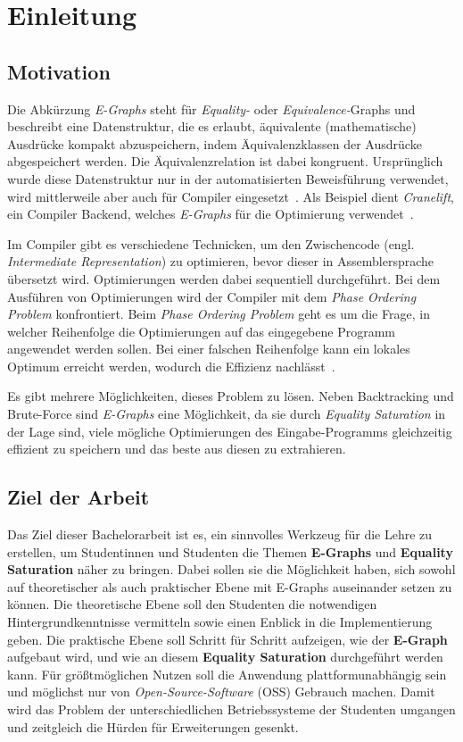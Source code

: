 \section{Einleitung}

\subsection{Motivation}

\noindent Die Abkürzung \textit{E-Graphs} steht für \textit{Equality-} oder \textit{Equivalence-}Graphs und beschreibt eine Datenstruktur, die es
 erlaubt, äquivalente (mathematische) Ausdrücke kompakt abzuspeichern, indem
Äquivalenzklassen der Ausdrücke abgespeichert werden. Die Äquivalenzrelation ist dabei kongruent. 
Ursprünglich wurde diese Datenstruktur nur in der automatisierten Beweisführung verwendet, wird mittlerweile aber auch für Compiler eingesetzt~\cite{2021-egg}.
Als Beispiel dient \textit{Cranelift}, ein Compiler Backend, welches \textit{E-Graphs} für die Optimierung verwendet~\cite{cranelift}.

\noindent Im Compiler gibt es verschiedene Technicken, um den Zwischencode (engl. \textit{Intermediate Representation}) zu optimieren, bevor dieser in 
Assemblersprache übersetzt wird. Optimierungen werden dabei sequentiell durchgeführt. Bei dem Ausführen von Optimierungen wird der Compiler mit dem \textit{Phase Ordering Problem}
konfrontiert. Beim \textit{Phase Ordering Problem} geht es um die Frage, in welcher Reihenfolge die Optimierungen auf das eingegebene 
Programm angewendet werden sollen. Bei einer falschen Reihenfolge kann ein lokales Optimum erreicht werden, wodurch die Effizienz nachlässt~\cite{phaseorder-2009}.

\noindent Es gibt mehrere Möglichkeiten, dieses Problem zu lösen. Neben Backtracking und Brute-Force sind \textit{E-Graphs} eine Möglichkeit, da sie durch \textit{Equality Saturation}
in der Lage sind, viele mögliche Optimierungen des Eingabe-Programms gleichzeitig effizient zu speichern und das beste aus diesen zu extrahieren.

\subsection{Ziel der Arbeit}

Das Ziel dieser Bachelorarbeit ist es, ein sinnvolles Werkzeug für die Lehre zu erstellen,
um Studentinnen und Studenten die Themen \textbf{E-Graphs} und \textbf{Equality Saturation} näher zu bringen.
Dabei sollen sie die Möglichkeit haben, sich sowohl auf theoretischer als auch praktischer Ebene mit E-Graphs auseinander setzen zu können.
Die theoretische Ebene soll den Studenten die notwendigen Hintergrundkenntnisse vermitteln sowie einen Enblick in die Implementierung geben.
Die praktische Ebene soll Schritt für Schritt aufzeigen, wie der \textbf{E-Graph} aufgebaut wird, und wie an diesem \textbf{Equality Saturation} durchgeführt werden kann.
Für grö{\ss}tmöglichen Nutzen soll die Anwendung plattformunabhängig sein und möglichst nur von \textit{Open-Source-Software} (OSS) Gebrauch machen.
Damit wird das Problem der unterschiedlichen Betriebssysteme der Studenten umgangen und zeitgleich die Hürden für Erweiterungen gesenkt.


